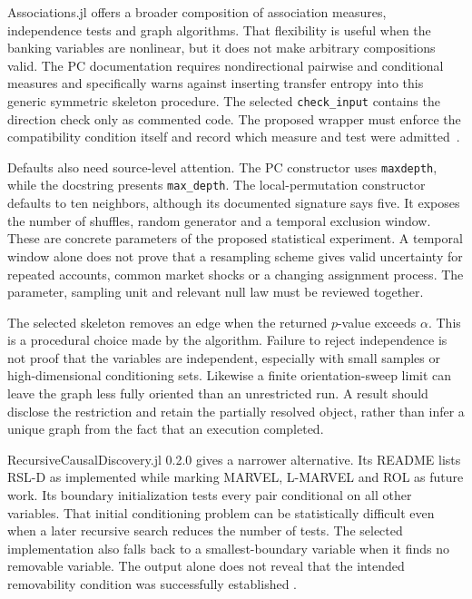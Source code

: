 Associations.jl offers a broader composition of association measures,
independence tests and graph algorithms. That flexibility is useful when the
banking variables are nonlinear, but it does not make arbitrary compositions
valid. The PC documentation requires nondirectional pairwise and conditional
measures and specifically warns against inserting transfer entropy into this
generic symmetric skeleton procedure. The selected \texttt{check\_input}
contains the direction check only as commented code. The proposed wrapper
must enforce the compatibility condition itself and record which measure and
test were admitted~\citep{exec13_other_associations}.

Defaults also need source-level attention. The PC constructor uses
\texttt{maxdepth}, while the docstring presents \texttt{max\_depth}.
The local-permutation constructor defaults to ten neighbors, although its
documented signature says five. It exposes the number of shuffles, random
generator and a temporal exclusion window. These are concrete parameters of
the proposed statistical experiment. A temporal window alone does not prove
that a resampling scheme gives valid uncertainty for repeated accounts,
common market shocks or a changing assignment process. The parameter,
sampling unit and relevant null law must be reviewed together.

The selected skeleton removes an edge when the returned $p$-value exceeds
$\alpha$. This is a procedural choice made by the algorithm. Failure to
reject independence is not proof that the variables are independent,
especially with small samples or high-dimensional conditioning sets.
Likewise a finite orientation-sweep limit can leave the graph less fully
oriented than an unrestricted run. A result should disclose the restriction
and retain the partially resolved object, rather than infer a unique graph
from the fact that an execution completed.

RecursiveCausalDiscovery.jl 0.2.0 gives a narrower alternative. Its README
lists RSL-D as implemented while marking MARVEL, L-MARVEL and ROL as future
work. Its boundary initialization tests every pair conditional on all other
variables. That initial conditioning problem can be statistically difficult
even when a later recursive search reduces the number of tests. The selected
implementation also falls back to a smallest-boundary variable when it finds
no removable variable. The output alone does not reveal that the intended
removability condition was successfully established
\citep{exec13_other_recursive}.

